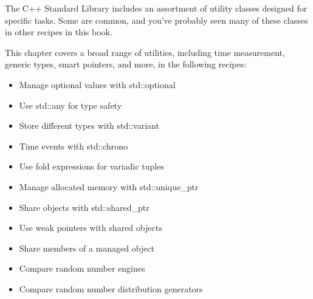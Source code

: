 The C++ Standard Library includes an assortment of utility classes designed for specific tasks. Some are common, and you've probably seen many of these classes in other recipes in this book.

This chapter covers a broad range of utilities, including time measurement, generic types, smart pointers, and more, in the following recipes:

\begin{itemize}
\item 
Manage optional values with std::optional

\item 
Use std::any for type safety

\item 
Store different types with std::variant

\item 
Time events with std::chrono

\item 
Use fold expressions for variadic tuples

\item 
Manage allocated memory with std::unique\_ptr

\item 
Share objects with std::shared\_ptr

\item 
Use weak pointers with shared objects

\item 
Share members of a managed object

\item 
Compare random number engines

\item 
Compare random number distribution generators
\end{itemize}